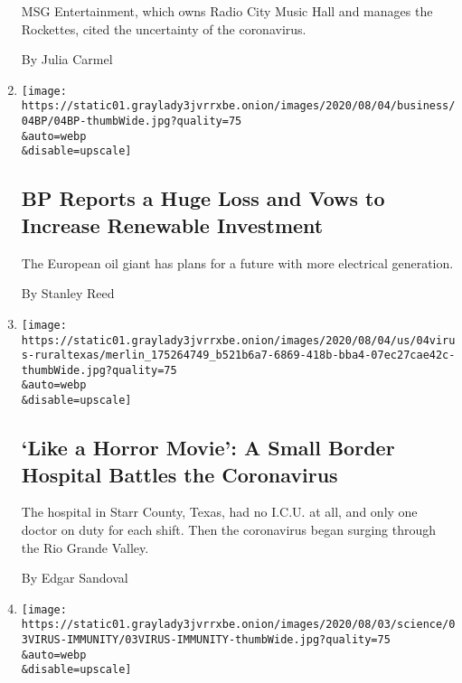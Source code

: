 \begin{enumerate}
  MSG Entertainment, which owns Radio City Music Hall and manages the
  Rockettes, cited the uncertainty of the coronavirus.

  By Julia Carmel
\item
  \href{/2020/08/04/business/energy-environment/bp-renewable-investment.html}{}

  \texttt{[image: https://static01.graylady3jvrrxbe.onion/images/2020/08/04/business/04BP/04BP-thumbWide.jpg?quality=75\\\&auto=webp\\\&disable=upscale]}

  \hypertarget{bp-reports-a-huge-loss-and-vows-to-increase-renewable-investment}{%
  \subsection{BP Reports a Huge Loss and Vows to Increase Renewable
  Investment}\label{bp-reports-a-huge-loss-and-vows-to-increase-renewable-investment}}

  The European oil giant has plans for a future with more electrical
  generation.

  By Stanley Reed
\item
  \href{/2020/08/04/us/texas-coronavirus-rio-grande-valley-starr-county.html}{}

  \texttt{[image: https://static01.graylady3jvrrxbe.onion/images/2020/08/04/us/04virus-ruraltexas/merlin\_175264749\_b521b6a7-6869-418b-bba4-07ec27cae42c-thumbWide.jpg?quality=75\\\&auto=webp\\\&disable=upscale]}

  \hypertarget{like-a-horror-movie-a-small-border-hospital-battles-the-coronavirus}{%
  \subsection{`Like a Horror Movie': A Small Border Hospital Battles the
  Coronavirus}\label{like-a-horror-movie-a-small-border-hospital-battles-the-coronavirus}}

  The hospital in Starr County, Texas, had no I.C.U. at all, and only
  one doctor on duty for each shift. Then the coronavirus began surging
  through the Rio Grande Valley.

  By Edgar Sandoval
\item
  \href{/2020/08/04/health/coronavirus-immune-system.html}{}

  \texttt{[image: https://static01.graylady3jvrrxbe.onion/images/2020/08/03/science/03VIRUS-IMMUNITY/03VIRUS-IMMUNITY-thumbWide.jpg?quality=75\\\&auto=webp\\\&disable=upscale]}

  \hypertarget{scientists-uncover-biological-signatures-of-the-worst-covid-19-cases}{%
}
\end{enumerate}
